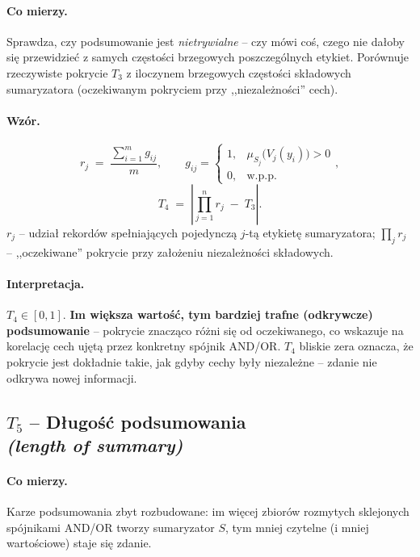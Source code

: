 \paragraph{Co mierzy.}
Sprawdza, czy podsumowanie jest \emph{nietrywialne} -- czy mówi coś,
czego nie dałoby się przewidzieć z samych częstości brzegowych
poszczególnych etykiet. Porównuje rzeczywiste pokrycie $T_3$
z iloczynem brzegowych częstości składowych sumaryzatora
(oczekiwanym pokryciem przy ,,niezależności'' cech).

\paragraph{Wzór.}
\begin{equation}
\label{eq:T4-rj}
    r_j \;=\; \frac{\sum_{i=1}^{m} g_{ij}}{m},
    \qquad
    g_{ij} = \begin{cases} 1, & \mu_{S_j}\bigl(V_j(y_i)\bigr) > 0 \\ 0, & \text{w.p.p.}\end{cases},
\end{equation}
\begin{equation}
\label{eq:T4}
    T_4 \;=\; \left| \prod_{j=1}^{n} r_j \;-\; T_3 \right|.
\end{equation}
$r_j$ -- udział rekordów spełniających pojedynczą $j$-tą etykietę
sumaryzatora; $\prod_j r_j$ -- ,,oczekiwane'' pokrycie przy założeniu
niezależności składowych.

\paragraph{Interpretacja.}
$T_4 \in [0, 1]$. \textbf{Im większa wartość, tym bardziej trafne
(odkrywcze) podsumowanie} -- pokrycie znacząco różni się od
oczekiwanego, co wskazuje na korelację cech ujętą przez konkretny
spójnik AND/OR. $T_4$ bliskie zera oznacza, że pokrycie jest dokładnie
takie, jak gdyby cechy były niezależne -- zdanie nie odkrywa nowej
informacji.

\subsection*{$T_5$ -- Długość podsumowania \\
\textit{(length of summary)}}

\paragraph{Co mierzy.}
Karze podsumowania zbyt rozbudowane: im więcej zbiorów rozmytych
sklejonych spójnikami AND/OR tworzy sumaryzator $S$, tym mniej
czytelne (i mniej wartościowe) staje się zdanie.

